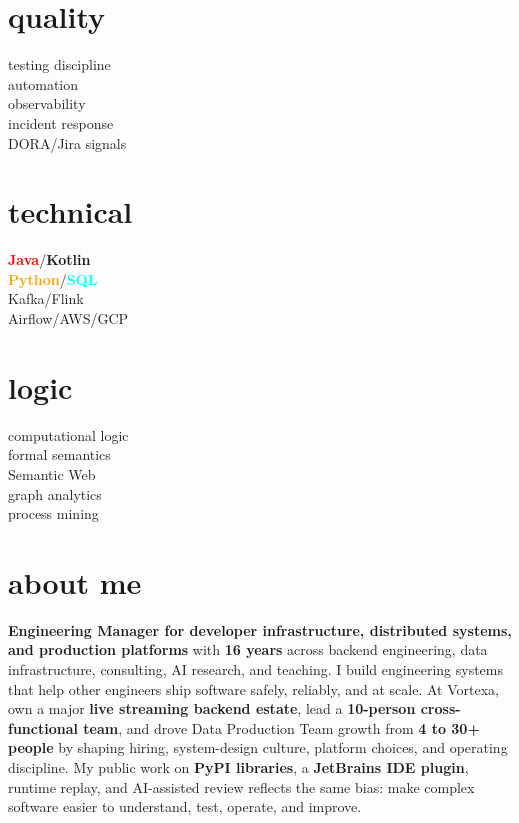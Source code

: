\documentclass[]{../../friggeri-cv}
\begin{document}
\begin{aside}
    \section{quality}
        {\footnotesize testing discipline\\automation\\observability\\incident response\\DORA/Jira signals}
    \section{technical}
        {\footnotesize \textbf{\textcolor{red}{Java}}/\textbf{\textcolor{red!50!black}{Kotlin}}\\\textbf{\textcolor{orange}{Python}}/\textbf{\textcolor{cyan}{SQL}}\\Kafka/Flink\\Airflow/AWS/GCP}
    \section{logic}
        {\footnotesize computational logic\\formal semantics\\Semantic Web\\graph analytics\\process mining}
\end{aside}

\section{about me}
{\small \textbf{Engineering Manager for developer infrastructure, distributed systems, and production platforms} with \textbf{16 years} across backend engineering, data infrastructure, consulting, AI research, and teaching. I build engineering systems that help other engineers ship software safely, reliably, and at scale. At Vortexa, own a major \textbf{live streaming backend estate}, lead a \textbf{10-person cross-functional team}, and drove Data Production Team growth from \textbf{4 to 30+ people} by shaping hiring, system-design culture, platform choices, and operating discipline. My public work on \textbf{PyPI libraries}, a \textbf{JetBrains IDE plugin}, runtime replay, and AI-assisted review reflects the same bias: make complex software easier to understand, test, operate, and improve.}
\end{document}
